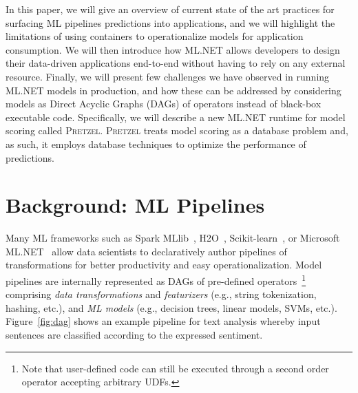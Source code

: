 \documentclass[11pt]{article}
\newcommand{\pretzel}{\textsc{Pretzel}\xspace}
\newcommand{\mlnet}{ML.NET\xspace}
\newcommand{\msft}{Microsoft\xspace}
\begin{document}

In this paper, we will give an overview of current state of the art practices for surfacing ML pipelines predictions into applications,
and we will highlight the limitations of using containers to operationalize models for application consumption.
We will then introduce how ML.NET allows developers to design their data-driven applications end-to-end without having to rely on any external resource.
Finally, we will present few challenges we have observed in running  \mlnet models in production, and how these can be addressed by considering models as Direct Acyclic Graphs (DAGs) of operators instead of black-box executable code.
Specifically, we will describe a new ML.NET runtime for model scoring called {\sc \pretzel}. {\sc \pretzel} treats model scoring as a database problem and, as such, it employs database techniques to optimize the performance of predictions.  

\section{Background: ML Pipelines}
Many ML frameworks such as Spark MLlib~\cite{mllib}, H2O~\cite{h2o}, Scikit-learn~\cite{scikit}, or Microsoft  \mlnet~\cite{mldotnet} allow data scientists to declaratively author pipelines of transformations for better productivity and easy operationalization. Model pipelines are internally represented as DAGs of pre-defined operators~\footnote{Note that user-defined code can still be executed through a second order operator accepting arbitrary UDFs.} comprising \emph{data transformations} and \emph{featurizers} (e.g., string tokenization, hashing, etc.), and \emph{ML models} (e.g., decision trees, linear models, SVMs, etc.).
Figure~\ref{fig:dag} shows an example pipeline for text analysis whereby input sentences are classified according to the expressed sentiment.
\end{document}
